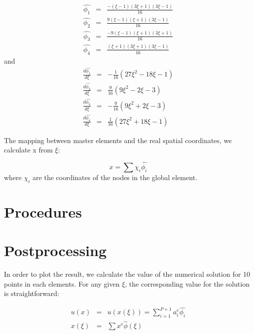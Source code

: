 \documentclass[paper=a4, fontsize=11pt]{article} %
\begin{document}
\begin{eqnarray}
\hat{\phi_1} &=& \frac{-(\xi-1)(3\xi+1)(3\xi-1)}{16} \nonumber\\
\hat{\phi_2} &=& \frac{9(\xi-1)(\xi+1)(3\xi-1)}{16} \nonumber\\
\hat{\phi_3} &=& \frac{-9(\xi-1)(\xi+1)(3\xi+1)}{16} \nonumber\\
\hat{\phi_4} &=& \frac{(\xi+1)(3\xi+1)(3\xi-1)}{16}
\end{eqnarray}
and
\begin{eqnarray}
\frac{d\hat{\phi_1}}{d\xi} &=& -\frac{1}{16} (27\xi^2 - 18\xi -1) \nonumber\\
\frac{d\hat{\phi_2}}{d\xi} &=& \frac{9}{16} (9\xi^2 -2\xi -3) \nonumber\\
\frac{d\hat{\phi_3}}{d\xi} &=& -\frac{9}{16} (9\xi^2 + 2\xi -3) \nonumber\\
\frac{d\hat{\phi_4}}{d\xi} &=& \frac{1}{16} (27\xi^2 + 18\xi-1)      
\end{eqnarray}

The mapping between master elements and the real spatial coordinates, we calculate x from $\xi$:

\begin{equation}
x = \sum{\chi _i \hat{\phi _i}}
\end{equation} 
where $\chi_i$ are the coordinates of the nodes in the global element.  

\section{Procedures}



\section{Postprocessing}
In order to plot the result, we calculate the value of the numerical solution for 10 points in each elements. For any given $\xi$, the corresponding value for the solution is straightforward:

\begin{eqnarray}
 u(x) &=& u(x(\xi))=\sum_{i=1}^{P+1} a_i^e \hat{\phi_i}\nonumber\\
 x(\xi) &=& \sum x^e \hat{\phi}(\xi)
 \end{eqnarray} 
\end{document}

